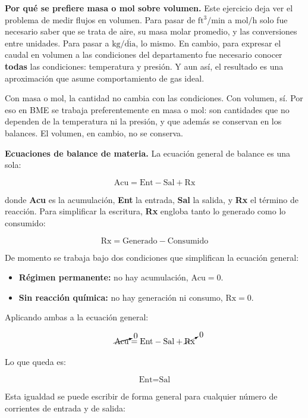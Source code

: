 \textbf{Por qué se prefiere masa o mol sobre volumen.} Este ejercicio
deja ver el problema de medir flujos en volumen. Para pasar de
$\mathrm{ft^3/min}$ a $\mathrm{mol/h}$ solo fue necesario saber que se
trata de aire, su masa molar promedio, y las conversiones entre
unidades. Para pasar a $\mathrm{kg/d\acute{i}a}$, lo mismo. En cambio,
para expresar el caudal en volumen a las condiciones del departamento
fue necesario conocer \textbf{todas} las condiciones: temperatura y
presión. Y aun así, el resultado es una aproximación que asume
comportamiento de gas ideal.

Con masa o mol, la cantidad no cambia con las condiciones. Con volumen,
sí. Por eso en BME se trabaja preferentemente en masa o mol: son
cantidades que no dependen de la temperatura ni la presión, y que
además se conservan en los balances. El volumen, en cambio, no se
conserva.


\textbf{Ecuaciones de balance de materia.} La ecuación general de
balance es una sola:

\[
\text{Acu} = \text{Ent} - \text{Sal} + \text{Rx}
\]

donde \textbf{Acu} es la acumulación, \textbf{Ent} la entrada,
\textbf{Sal} la salida, y \textbf{Rx} el término de reacción. Para
simplificar la escritura, \textbf{Rx} engloba tanto lo generado como
lo consumido:

\[
\text{Rx} = \text{Generado} - \text{Consumido}
\]

De momento se trabaja bajo dos condiciones que simplifican la
ecuación general:

\begin{itemize}
    \item \textbf{Régimen permanente:} no hay acumulación,
    $\text{Acu} = 0$.
    \item \textbf{Sin reacción química:} no hay generación ni
    consumo, $\text{Rx} = 0$.
\end{itemize}

Aplicando ambas a la ecuación general:

\[
\cancelto{0}{\text{Acu}} = \text{Ent} - \text{Sal} + \cancelto{0}{\text{Rx}}
\]

Lo que queda es:

\[
\text{Ent} = \text{Sal}
\]

Esta igualdad se puede escribir de forma general para cualquier
número de corrientes de entrada y de salida:

